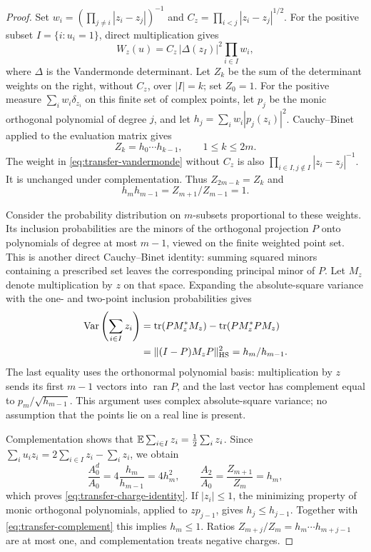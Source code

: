 \begin{proof}
Set $w_i=(\prod_{j\ne i}|z_i-z_j|)^{-1}$ and
$C_z=\prod_{i<j}|z_i-z_j|^{1/2}$.  For the positive subset
$I=\{i:u_i=1\}$, direct multiplication gives
\begin{equation}
 W_z(u)=C_z\,|\Delta(z_I)|^2\prod_{i\in I}w_i,
 \label{eq:transfer-vandermonde}
\end{equation}
where $\Delta$ is the Vandermonde determinant.  Let $Z_k$ be the sum of
the determinant weights on the right, without $C_z$, over $|I|=k$;
set $Z_0=1$.  For the positive measure $\sum_iw_i\delta_{z_i}$ on
this finite set of complex points,
let $p_j$ be the monic orthogonal polynomial of degree $j$, and let
$h_j=\sum_iw_i|p_j(z_i)|^2$.  Cauchy--Binet applied to the evaluation
matrix gives
\begin{equation}
 Z_k=h_0\cdots h_{k-1},\qquad 1\leq k\leq2m.
 \label{eq:transfer-gram}
\end{equation}
The weight in \eqref{eq:transfer-vandermonde} without $C_z$ is also
$\prod_{i\in I,j\notin I}|z_i-z_j|^{-1}$.
It is unchanged under complementation.  Thus $Z_{2m-k}=Z_k$ and
\begin{equation}
 h_mh_{m-1}=Z_{m+1}/Z_{m-1}=1.
 \label{eq:transfer-complement}
\end{equation}

Consider the probability distribution on $m$-subsets proportional to
these weights.  Its inclusion probabilities are the minors of the
orthogonal projection $P$ onto polynomials of degree at most $m-1$,
viewed on the finite weighted point set.  This is another direct
Cauchy--Binet identity: summing squared minors containing a prescribed
set leaves the corresponding principal minor of $P$.
Let $M_z$ denote multiplication by $z$ on that space.  Expanding the
absolute-square variance with the one- and two-point inclusion
probabilities gives
\begin{align*}
 \operatorname{Var}\left(\sum_{i\in I}z_i\right)
 &=\operatorname{tr}(PM_z^*M_z)
       -\operatorname{tr}(PM_z^*PM_z)\\
 &=\|(I-P)M_zP\|_{\mathrm{HS}}^2
   =h_m/h_{m-1}.
\end{align*}
The last equality uses the orthonormal polynomial basis: multiplication
by $z$ sends its first $m-1$ vectors into $\operatorname{ran}P$, and
the last vector has complement equal to $p_m/\sqrt{h_{m-1}}$.
This argument uses complex absolute-square variance; no assumption that
the points lie on a real line is present.

Complementation shows that
$\mathbb E\sum_{i\in I}z_i=\tfrac12\sum_i z_i$.  Since
$\sum_i u_i z_i=2\sum_{i\in I}z_i-\sum_i z_i$, we obtain
\[
 \frac{A_0^d}{A_0}=4\frac{h_m}{h_{m-1}}=4h_m^2,
 \qquad \frac{A_2}{A_0}=\frac{Z_{m+1}}{Z_m}=h_m,
\]
which proves \eqref{eq:transfer-charge-identity}.
If $|z_i|\leq1$, the minimizing property of monic orthogonal
polynomials, applied to $zp_{j-1}$, gives $h_j\leq h_{j-1}$.
Together with \eqref{eq:transfer-complement} this implies $h_m\leq1$.
Ratios $Z_{m+j}/Z_m=h_m\cdots h_{m+j-1}$ are at most one, and
complementation treats negative charges.
\end{proof}

